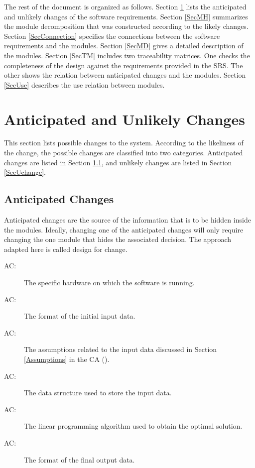 \documentclass[12pt, titlepage]{article}
\newcounter{acnum}
\newcommand{\actheacnum}{AC\theacnum}
\begin{document}
The rest of the document is organized as follows. Section
\ref{SecChange} lists the anticipated and unlikely changes of the software
requirements. Section \ref{SecMH} summarizes the module decomposition that
was constructed according to the likely changes. Section \ref{SecConnection}
specifies the connections between the software requirements and the
modules. Section \ref{SecMD} gives a detailed description of the
modules. Section \ref{SecTM} includes two traceability matrices. One checks
the completeness of the design against the requirements provided in the SRS. The
other shows the relation between anticipated changes and the modules. Section
\ref{SecUse} describes the use relation between modules.

\section{Anticipated and Unlikely Changes} \label{SecChange}

This section lists possible changes to the system. According to the likeliness
of the change, the possible changes are classified into two
categories. Anticipated changes are listed in Section \ref{SecAchange}, and
unlikely changes are listed in Section \ref{SecUchange}.

\subsection{Anticipated Changes} \label{SecAchange}

Anticipated changes are the source of the information that is to be hidden
inside the modules. Ideally, changing one of the anticipated changes will only
require changing the one module that hides the associated decision. The approach
adapted here is called design for
change.

\begin{description}
\item[ \actheacnum \label{acHardware}:] The specific
  hardware on which the software is running.
  
\item[ \actheacnum \label{acInput}:] The format of the
  initial input data.
  
\item[ \actheacnum \label{acInputAssumption}:] The 
assumptions related to the input data discussed in Section \ref{Assumptions} in 
the CA (\cite{losms-ca}).

\item[ \actheacnum \label{acInputDataStructure}:] The 
data structure used to store the input data.

\item[ \actheacnum \label{acAlgorithm}:] The linear 
programming algorithm used to obtain the optimal solution.

\item[ \actheacnum \label{acOutput}:] The format of the 
final output data.
\end{description}
\end{document}
